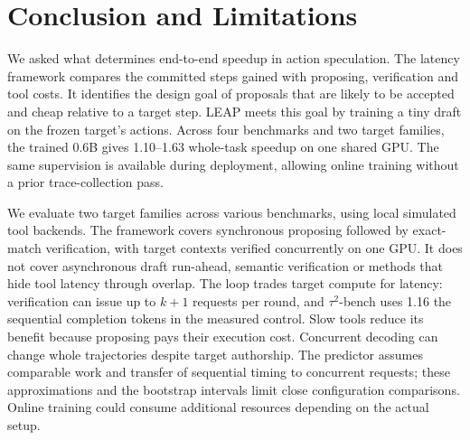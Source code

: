 \section{Conclusion and Limitations}
\label{sec:conclusion}
We asked what determines end-to-end speedup in action speculation. The latency framework compares
the committed steps gained with proposing, verification and tool costs. It identifies the design
goal of proposals that are likely to be accepted and cheap relative to a target step. LEAP meets
this goal by training a tiny draft on the frozen target's actions. Across four benchmarks and two
target families, the trained 0.6B gives 1.10--1.63\xx{} whole-task speedup on one shared GPU.
The same supervision is available during deployment, allowing online training without a prior
trace-collection pass.

We evaluate two target families across various benchmarks, using local
simulated tool backends. The framework covers synchronous proposing followed by exact-match
verification, with target contexts verified concurrently on one GPU. It does not cover asynchronous
draft run-ahead, semantic verification or methods that hide tool latency through overlap.
The loop trades target compute for latency: verification can issue up to
$k+1$ requests per round, and $\tau^2$-bench uses 1.16\xx{} the sequential completion tokens in
the measured control. Slow tools reduce its benefit because proposing pays their execution cost.
Concurrent decoding can change whole trajectories despite target authorship. The predictor assumes
comparable work and transfer of sequential timing to concurrent requests; these approximations and
the bootstrap intervals limit close configuration comparisons. Online training could consume additional
resources depending on the actual setup.
\label{main:text_end}
